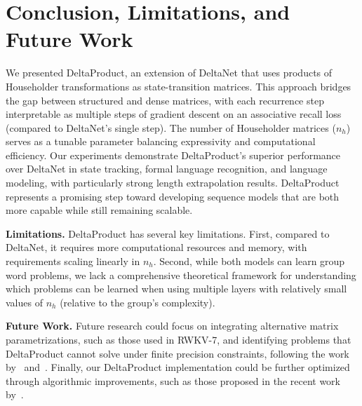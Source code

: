 \documentclass{article} %
\begin{document}
\section{Conclusion, Limitations, and Future Work}
We presented DeltaProduct, an extension of DeltaNet that uses products of Householder transformations as state-transition matrices. This approach bridges the gap between structured and dense matrices, with each recurrence step interpretable as multiple steps of gradient descent on an associative recall loss (compared to DeltaNet's single step). The number of Householder matrices ($n_h$) serves as a tunable parameter balancing expressivity and computational efficiency. Our experiments demonstrate DeltaProduct's superior performance over DeltaNet in state tracking, formal language recognition, and language modeling, with particularly strong length extrapolation results.
DeltaProduct represents a promising step toward developing sequence models that are both more capable while still remaining scalable.

\textbf{Limitations.} DeltaProduct has several key limitations. First, compared to DeltaNet, it requires more computational resources and memory, with requirements scaling linearly in $n_h$. Second, while both models can learn group word problems, we lack a comprehensive theoretical framework for understanding which problems can be learned when using multiple layers with relatively small values of $n_h$ (relative to the group's complexity).

\textbf{Future Work.} Future research could focus on integrating alternative matrix parametrizations, such as those used in RWKV-7, and identifying problems that DeltaProduct cannot solve under finite precision constraints, following the work by~\citet{sarrof-neurips24a} and~\citet{grazzi-iclr25a}. Finally, our DeltaProduct implementation could be further optimized through algorithmic improvements, such as those proposed in the recent work by~\citet{cirone2025parallelflow}.
\end{document}
